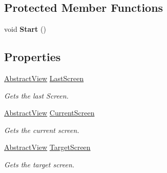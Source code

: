 \subsection*{Protected Member Functions}
\begin{DoxyCompactItemize}
\item 
\hypertarget{class_scaffolding_1_1_view_manager_a20eef73a9db449ba636716b8381ea282}{void {\bfseries Start} ()}\label{class_scaffolding_1_1_view_manager_a20eef73a9db449ba636716b8381ea282}

\end{DoxyCompactItemize}
\subsection*{Properties}
\begin{DoxyCompactItemize}
\item 
\hyperlink{class_scaffolding_1_1_abstract_view}{Abstract\-View} \hyperlink{class_scaffolding_1_1_view_manager_ac4d88a4e3c77abab903d16959b45cdae}{Last\-Screen}
\begin{DoxyCompactList}\small\item\em Gets the last Screen. \end{DoxyCompactList}\item 
\hyperlink{class_scaffolding_1_1_abstract_view}{Abstract\-View} \hyperlink{class_scaffolding_1_1_view_manager_aeba5a2db8a3551991c2be765ee700dbd}{Current\-Screen}
\begin{DoxyCompactList}\small\item\em Gets the current screen. \end{DoxyCompactList}\item 
\hyperlink{class_scaffolding_1_1_abstract_view}{Abstract\-View} \hyperlink{class_scaffolding_1_1_view_manager_ad77b108adca50eb2af05eb2dbbe13701}{Target\-Screen}
\begin{DoxyCompactList}\small\item\em Gets the target screen. \end{DoxyCompactList}\end{DoxyCompactItemize}


